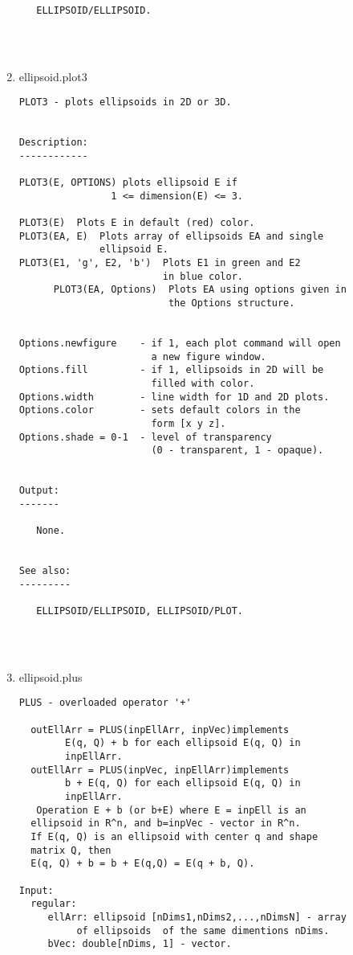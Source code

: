 \begin{enumerate}
\begin{lstlisting}
   ELLIPSOID/ELLIPSOID.




\end{lstlisting}
\fontfamily{\familydefault}
\selectfont
\item {ellipsoid.plot3}
\selectfont
\begin{lstlisting}
PLOT3 - plots ellipsoids in 2D or 3D.


Description:
------------

PLOT3(E, OPTIONS) plots ellipsoid E if
                1 <= dimension(E) <= 3.

PLOT3(E)  Plots E in default (red) color.
PLOT3(EA, E)  Plots array of ellipsoids EA and single
              ellipsoid E.
PLOT3(E1, 'g', E2, 'b')  Plots E1 in green and E2
                         in blue color.
      PLOT3(EA, Options)  Plots EA using options given in
                          the Options structure.


Options.newfigure    - if 1, each plot command will open
                       a new figure window.
Options.fill         - if 1, ellipsoids in 2D will be
                       filled with color.
Options.width        - line width for 1D and 2D plots.
Options.color        - sets default colors in the
                       form [x y z].
Options.shade = 0-1  - level of transparency
                       (0 - transparent, 1 - opaque).


Output:
-------

   None.


See also:
---------

   ELLIPSOID/ELLIPSOID, ELLIPSOID/PLOT.




\end{lstlisting}
\fontfamily{\familydefault}
\selectfont
\item {ellipsoid.plus}
\selectfont
\begin{lstlisting}
PLUS - overloaded operator '+'

  outEllArr = PLUS(inpEllArr, inpVec)implements
        E(q, Q) + b for each ellipsoid E(q, Q) in
        inpEllArr.
  outEllArr = PLUS(inpVec, inpEllArr)implements
        b + E(q, Q) for each ellipsoid E(q, Q) in
        inpEllArr.
   Operation E + b (or b+E) where E = inpEll is an
  ellipsoid in R^n, and b=inpVec - vector in R^n.
  If E(q, Q) is an ellipsoid with center q and shape
  matrix Q, then
  E(q, Q) + b = b + E(q,Q) = E(q + b, Q).

Input:
  regular:
     ellArr: ellipsoid [nDims1,nDims2,...,nDimsN] - array
          of ellipsoids  of the same dimentions nDims.
     bVec: double[nDims, 1] - vector.


\end{lstlisting}
\end{enumerate}
